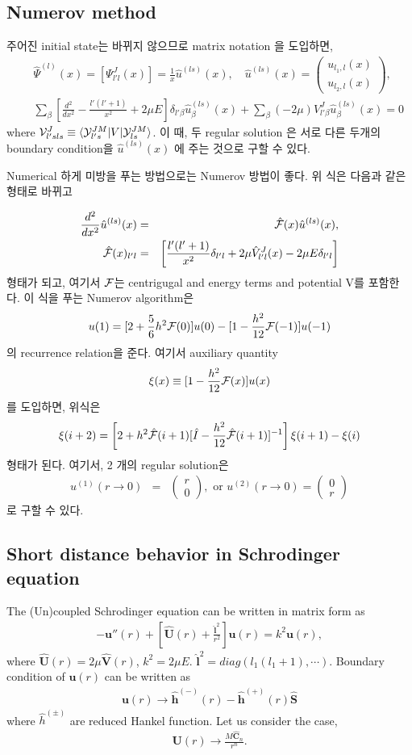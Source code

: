 \documentclass[10pt]{article}
\def\bm{\boldsymbol}
\newcommand{\bea}{\begin{eqnarray}}
\newcommand{\eea}{\end{eqnarray}}
\newcommand{\no}{\nonumber \\}
\def\la{\langle}
\def\ra{\rangle}
\begin{document}
  





\subsection{Numerov method}

주어진 initial state는 바뀌지 않으므로 matrix notation 을 도입하면,
\bea
& &\hat{\Psi}^{(l)}(x)=[\Psi^J_{l' l}(x)]=\frac{1}{x}\hat{u}^{(ls)}(x),
\quad \hat{u}^{(ls)}(x)=\left(\begin{array}{c} u_{l_1,l}(x) \\ u_{l_2,l}(x) \end{array}\right),\no
& &\sum_{\beta}\left[\frac{d^2}{dx^2}-\frac{l'(l'+1)}{x^2}+2\mu E\right]
   \delta_{l'\beta}\hat{u}^{(ls)}_\beta (x)
   +\sum_\beta (-2\mu )V^J_{l'\beta}\hat{u}^{(ls)}_\beta(x) =0
\eea
where ${\cal V}^{J}_{l's ls}\equiv \la {\cal Y}^{JM}_{l's}|V|{\cal Y}^{JM}_{ls}\ra$.
이 때, 두 regular solution 은 서로 다른 두개의 boundary condition을 
$\hat{u}^{(ls)}(x)$ 에 주는 것으로 구할 수 있다.

Numerical 하게 미방을 푸는 방법으로는 Numerov 방법이 좋다. 위 식은
다음과 같은 형태로 바뀌고

\bea
\frac{d^2}{dx^2}\hat{u}^{(ls)}(x)&=&{\cal \hat{F}}(x) \hat{u}^{(ls)}(x),\no
\hat{\cal F}(x)_{l'l}&=&
\left[\frac{l'(l'+1)}{x^2}\delta_{l'l}+2\mu\hat{V}^J_{l'l}(x)-2\mu E\delta_{l'l}
\right]
\eea
형태가 되고, 여기서 ${\cal F}$는 
centrigugal and energy terms and potential V를 포함한다.
이 식을 푸는 Numerov algorithm은 
\bea
[1-\frac{h^2}{12}{\cal F}(1)]u(1)=[2+\frac{5}{6}h^2 {\cal F}(0)]u(0)
                       -[1-\frac{h^2}{12}{\cal F}(-1)]u(-1)                                               
\eea
의 recurrence relation을 준다. 여기서 
auxiliary quantity 
$$\xi(x)\equiv[1-\frac{h^2}{12}{\cal F}(x)]u(x)$$ 
를 도입하면, 위식은
\bea
\xi(i+2)=\left[2+h^2{\cal \hat{F}}(i+1)[\hat{I}-\frac{h^2}{12}{\cal\hat{ F}}(i+1)]^{-1}\right]\xi(i+1)-\xi(i)
\eea
형태가 된다. 
여기서, 2 개의 regular solution은 
\bea
u^{(1)}(r\to 0)&=&\left(\begin{array}{c} r\\ 0 \end{array}\right), \mbox{ or }
  u^{(2)}(r\to 0)=\left(\begin{array}{c} 0\\ r \end{array}\right)
\eea
로 구할 수 있다.

\subsection{Short distance behavior in Schrodinger equation }
The (Un)coupled Schrodinger equation can be written in 
matrix form as
\bea
-{\bm u}''(r)+\left[\hat{\bm U}(r)+\frac{\hat{\bm l}^2}{r^2}\right]
{\bm u}(r)=k^2{\bm u}(r),
\eea
where $\hat{\bm U}(r)=2\mu\hat{\bm V}(r)$,
$k^2=2\mu E$. $\hat{\bm l}^2=diag(l_1(l_1+1),\cdots)$.
Boundary condition of ${\bm u}(r)$ can be written as
\bea
{\bm u}(r)\rightarrow \hat{\bm h}^{(-)}(r)
                     -\hat{\bm h}^{(+)}(r)\hat{\bm S}
\eea
where $\hat{h}^{(\pm)}$ are reduced Hankel function.
Let us consider the case,
\bea
{\bm U}(r)\to \frac{M \hat{\bm C}_n}{r^n}.
\eea
\end{document}
